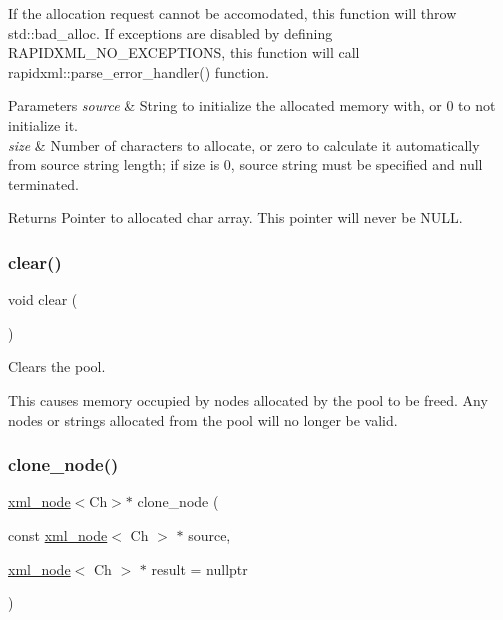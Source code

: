 If the allocation request cannot be accomodated, this function will throw {\ttfamily std\+::bad\+\_\+alloc}. If exceptions are disabled by defining R\+A\+P\+I\+D\+X\+M\+L\+\_\+\+N\+O\+\_\+\+E\+X\+C\+E\+P\+T\+I\+O\+NS, this function will call rapidxml\+::parse\+\_\+error\+\_\+handler() function. 
\begin{DoxyParams}{Parameters}
{\em source} & String to initialize the allocated memory with, or 0 to not initialize it. \\
\hline
{\em size} & Number of characters to allocate, or zero to calculate it automatically from source string length; if size is 0, source string must be specified and null terminated. \\
\hline
\end{DoxyParams}
\begin{DoxyReturn}{Returns}
Pointer to allocated char array. This pointer will never be N\+U\+LL. 
\end{DoxyReturn}
\mbox{\label{classrapidxml_1_1memory__pool_ac8bb3912a3ce86b15842e79d0b421204}} 
\subsubsection{\texorpdfstring{clear()}{clear()}}
{\footnotesize\ttfamily void clear (\begin{DoxyParamCaption}{ }\end{DoxyParamCaption})\hspace{0.3cm}{\ttfamily [inline]}}



Clears the pool. 

This causes memory occupied by nodes allocated by the pool to be freed. Any nodes or strings allocated from the pool will no longer be valid. \mbox{\label{classrapidxml_1_1memory__pool_ae8bc45920cb126b6a4bb29f667800ea2}} 
\subsubsection{\texorpdfstring{clone\+\_\+node()}{clone\_node()}}
{\footnotesize\ttfamily \mbox{\hyperlink{classrapidxml_1_1xml__node}{xml\+\_\+node}}$<$Ch$>$$\ast$ clone\+\_\+node (\begin{DoxyParamCaption}\item[{const \mbox{\hyperlink{classrapidxml_1_1xml__node}{xml\+\_\+node}}$<$ Ch $>$ $\ast$}]{source,  }\item[{\mbox{\hyperlink{classrapidxml_1_1xml__node}{xml\+\_\+node}}$<$ Ch $>$ $\ast$}]{result = {\ttfamily nullptr} }\end{DoxyParamCaption})\hspace{0.3cm}{\ttfamily [inline]}}



